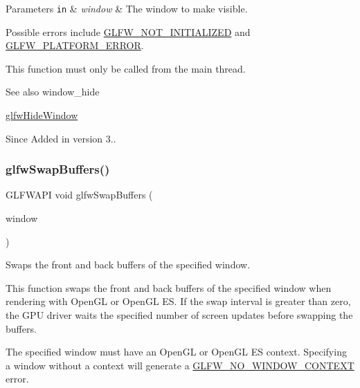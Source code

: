 \begin{DoxyParams}[1]{Parameters}
\mbox{\tt in}  & {\em window} & The window to make visible.\\
\hline
\end{DoxyParams}
Possible errors include \hyperlink{group__errors_ga2374ee02c177f12e1fa76ff3ed15e14a}{G\+L\+F\+W\+\_\+\+N\+O\+T\+\_\+\+I\+N\+I\+T\+I\+A\+L\+I\+Z\+ED} and \hyperlink{group__errors_gad44162d78100ea5e87cdd38426b8c7a1}{G\+L\+F\+W\+\_\+\+P\+L\+A\+T\+F\+O\+R\+M\+\_\+\+E\+R\+R\+OR}.

This function must only be called from the main thread.

\begin{DoxySeeAlso}{See also}
window\+\_\+hide 

\hyperlink{group__window_gaa17e287d521544bdeceafa09ac036e20}{glfw\+Hide\+Window}
\end{DoxySeeAlso}
\begin{DoxySince}{Since}
Added in version 3.. 
\end{DoxySince}
\mbox{\label{group__window_gafb827800eedbfcbc97b1e5408df668d7}} 
\subsubsection{\texorpdfstring{glfw\+Swap\+Buffers()}{glfwSwapBuffers()}}
{\footnotesize\ttfamily G\+L\+F\+W\+A\+PI void glfw\+Swap\+Buffers (\begin{DoxyParamCaption}\item[{\hyperlink{group__window_ga3c96d80d363e67d13a41b5d1821f3242}{G\+L\+F\+Wwindow} $\ast$}]{window }\end{DoxyParamCaption})}



Swaps the front and back buffers of the specified window. 

This function swaps the front and back buffers of the specified window when rendering with Open\+GL or Open\+GL ES. If the swap interval is greater than zero, the G\+PU driver waits the specified number of screen updates before swapping the buffers.

The specified window must have an Open\+GL or Open\+GL ES context. Specifying a window without a context will generate a \hyperlink{group__errors_gacff24d2757da752ae4c80bf452356487}{G\+L\+F\+W\+\_\+\+N\+O\+\_\+\+W\+I\+N\+D\+O\+W\+\_\+\+C\+O\+N\+T\+E\+XT} error.

